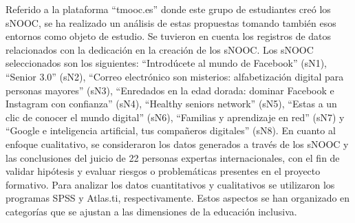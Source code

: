 	Referido a la plataforma ``tmooc.es'' donde este grupo de estudiantes
	creó los sNOOC, se ha realizado un análisis de estas propuestas tomando
	también esos entornos como objeto de estudio. Se tuvieron en cuenta los
	registros de datos relacionados con la dedicación en la creación de los
	sNOOC. Los sNOOC seleccionados son los siguientes: ``Introdúcete al
	mundo de Facebook'' (sN1), ``Senior 3.0'' (sN2), ``Correo electrónico
	son misterios: alfabetización digital para personas mayores'' (sN3),
	``Enredados en la edad dorada: dominar Facebook e Instagram con
	confianza'' (sN4), ``Healthy seniors network'' (sN5), ``Estas a un clic
	de conocer el mundo digital'' (sN6), ``Familias y aprendizaje en red''
	(sN7) y ``Google e inteligencia artificial, tus compañeros digitales''
	(sN8). En cuanto al enfoque cualitativo, se consideraron los datos
	generados a través de los sNOOC y las conclusiones del juicio de 22
	personas expertas internacionales, con el fin de validar hipótesis y
	evaluar riesgos o problemáticas presentes en el proyecto formativo. Para
	analizar los datos cuantitativos y cualitativos se utilizaron los
	programas SPSS y Atlas.ti, respectivamente. Estos aspectos se han
	organizado en categorías que se ajustan a las dimensiones de la
	educación inclusiva.
